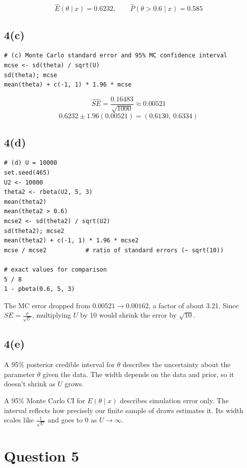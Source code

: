 \documentclass[11pt]{article}
\begin{document}
\[
\hat{E}(\theta\mid x) = 0.6232, \qquad \hat{P}(\theta > 0.6\mid x) = 0.585
\]

\subsection*{4(c)}

\begin{verbatim}
# (c) Monte Carlo standard error and 95% MC confidence interval
mcse <- sd(theta) / sqrt(U)
sd(theta); mcse
mean(theta) + c(-1, 1) * 1.96 * mcse
\end{verbatim}

\[
\widehat{SE} = \frac{0.16483}{\sqrt{1000}} \approx 0.00521
\]
\[
0.6232 \pm 1.96(0.00521) = (0.6130,\ 0.6334)
\]

\subsection*{4(d)}

\begin{verbatim}
# (d) U = 10000
set.seed(465)
U2 <- 10000
theta2 <- rbeta(U2, 5, 3)
mean(theta2)
mean(theta2 > 0.6)
mcse2 <- sd(theta2) / sqrt(U2)
sd(theta2); mcse2
mean(theta2) + c(-1, 1) * 1.96 * mcse2
mcse / mcse2           # ratio of standard errors (~ sqrt(10))

# exact values for comparison
5 / 8
1 - pbeta(0.6, 5, 3)
\end{verbatim}

The MC error dropped from $0.00521 \to 0.00162$, a factor of about 3.21. Since $SE = \frac{\sigma}{\sqrt{U}}$, multiplying $U$ by 10 would shrink the error by $\sqrt{10}$.

\subsection*{4(e)}
A 95\% posterior credible interval for $\theta$ describes the uncertainty about the parameter $\theta$ given the data. The width depends on the data and prior, so it doesn't shrink as $U$ grows.

A 95\% Monte Carlo CI for $E(\theta\mid x)$ describes simulation error only. The interval reflects how precisely our finite sample of draws estimates it. Its width scales like $\frac{1}{\sqrt{U}}$ and goes to 0 as $U \to \infty$.

\section*{Question 5}
\end{document}
